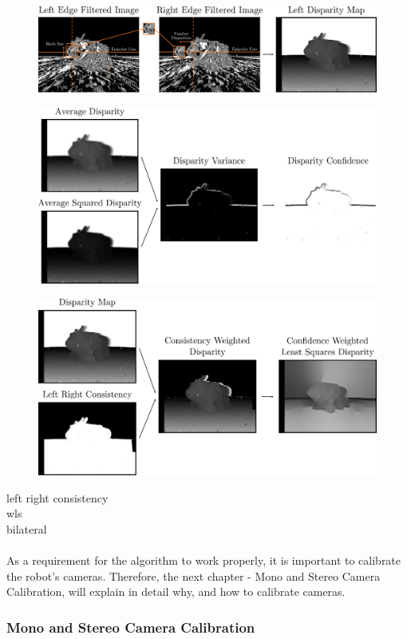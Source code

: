 \begin{figure}[h]
	\centering
	\includegraphics[scale=.28]{chapters/03_background/img/left_disparity_map.png}
	\caption{}
	\label{fig::323_left_disparity_map}
\end{figure}
\begin{figure}[h]
	\centering
	\includegraphics[scale=.28]{chapters/03_background/img/confidence_map.png}
	\caption{}
	\label{fig::323_confidence_map}
\end{figure}
\begin{figure}[h]
	\centering
	\includegraphics[scale=.28]{chapters/03_background/img/weighted_least_squares_disparity.png}
	\caption{}
	\label{fig::323_weighted_least_squares_disparity}
\end{figure}

\cite{egnal2004stereo} left right consistency\\
\cite{min2014fast}   wls\\
\cite{tomasi1998bilateral} bilateral
\\\\
As a requirement for the algorithm to work properly, it is important to calibrate the robot's cameras. Therefore, the next chapter - Mono and Stereo Camera Calibration, will explain in detail why, and how to calibrate cameras.
\subsubsection{Mono and Stereo Camera Calibration}